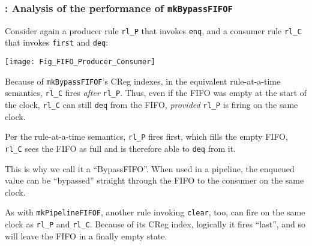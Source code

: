 \begin{frame}[fragile]
\frametitle{{\BSV}: Analysis of the performance of {\tt mkBypassFIFOF}}

\footnotesize

\begin{minipage}{0.45\textwidth}
  Consider again a producer rule \verb|rl_P| that invokes \verb|enq|, and a
  consumer rule \verb|rl_C| that invokes \verb|first| and \verb|deq|:
\end{minipage}
\hm
\begin{minipage}{0.5\textwidth}
  \texttt{[image: Fig\_FIFO\_Producer\_Consumer]}
\end{minipage}

\vspace{5ex}

Because of {\tt mkBypassFIFOF}'s CReg indexes, in the equivalent
rule-at-a-time semantics, \verb|rl_C| fires \emph{after} \verb|rl_P|.
Thus, even if the FIFO was empty at the start of the clock, \verb|rl_C|
can still \verb|deq| from the FIFO, \emph{provided} \verb|rl_P| is
firing on the same clock.

\vspace{1ex}

Per the rule-at-a-time semantics, \verb|rl_P| fires first, which fills
the empty FIFO, {\ie} \verb|rl_C| sees the FIFO as full and is
therefore able to \verb|deq| from it.

\vspace{1ex}

This is why we call it a ``BypassFIFO''.  When used in a pipeline, the
enqueued value can be ``bypassed'' straight through the FIFO to the
consumer on the same clock.

\vspace{2ex}

As with {\tt mkPipelineFIFOF}, another rule invoking \verb|clear|,
too, can fire on the same clock as \verb|rl_P| and \verb|rl_C|.
Because of its CReg index, logically it fires ``last'', and so will
leave the FIFO in a finally empty state.

\end{frame}


